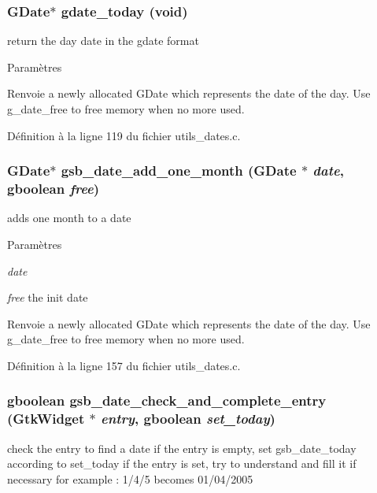 \subsubsection[{gdate\_\-today}]{\setlength{\rightskip}{0pt plus 5cm}GDate$\ast$ gdate\_\-today (void)}\label{utils__dates_8c_a6b816aab8b5dd412b89406bcc587738b}
return the day date in the gdate format


\begin{DoxyParams}{Paramètres}
\item[{\em }]\end{DoxyParams}
\begin{DoxyReturn}{Renvoie}
a newly allocated GDate which represents the date of the day. Use g\_\-date\_\-free to free memory when no more used. 
\end{DoxyReturn}


Définition à la ligne 119 du fichier utils\_\-dates.c.

\subsubsection[{gsb\_\-date\_\-add\_\-one\_\-month}]{\setlength{\rightskip}{0pt plus 5cm}GDate$\ast$ gsb\_\-date\_\-add\_\-one\_\-month (GDate $\ast$ {\em date}, \/  gboolean {\em free})}\label{utils__dates_8c_a146f578d7f01aba9a13fbed426295b9d}
adds one month to a date


\begin{DoxyParams}{Paramètres}
\item[{\em date}]\item[{\em free}]the init date\end{DoxyParams}
\begin{DoxyReturn}{Renvoie}
a newly allocated GDate which represents the date of the day. Use g\_\-date\_\-free to free memory when no more used. 
\end{DoxyReturn}


Définition à la ligne 157 du fichier utils\_\-dates.c.

\subsubsection[{gsb\_\-date\_\-check\_\-and\_\-complete\_\-entry}]{\setlength{\rightskip}{0pt plus 5cm}gboolean gsb\_\-date\_\-check\_\-and\_\-complete\_\-entry (GtkWidget $\ast$ {\em entry}, \/  gboolean {\em set\_\-today})}\label{utils__dates_8c_af09f2167efc12cc516f17c3c04c05f2f}
check the entry to find a date if the entry is empty, set gsb\_\-date\_\-today according to set\_\-today if the entry is set, try to understand and fill it if necessary for example : 1/4/5 becomes 01/04/2005


